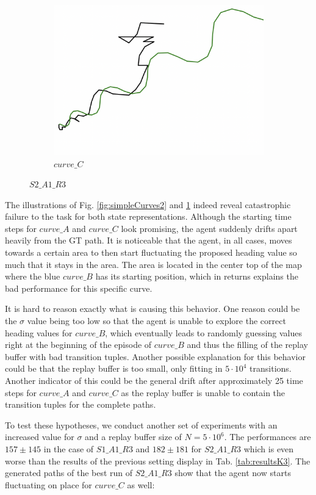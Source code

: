 \begin{figure}[H]
\begin{subfigure}[b]{0.31\textwidth}
         \includegraphics[width=\textwidth]{images/ddpg_results/simple_envs_S1_S2/S2_A1_R3_K3_curve_C.png}
         \caption{$curve\_C$}
     \end{subfigure}
        \caption{$S2\_A1\_R3$}
        \label{fig:simpleCurves3}
\end{figure}

The illustrations of Fig. \ref{fig:simpleCurves2} and \ref{fig:simpleCurves3} indeed reveal catastrophic failure to the task for both state representations. Although the starting time steps for $curve\_A$ and $curve\_C$ look promising, the agent suddenly drifts apart heavily from the GT path. It is noticeable that the agent, in all cases, moves towards a certain area to then start fluctuating the proposed heading value so much that it stays in the area. The area is located in the center top of the map where the blue $curve\_B$ has its starting position, which in returns explains the bad performance for this specific curve. 
\par
It is hard to reason exactly what is causing this behavior. One reason could be the $\sigma$ value being too low so that the agent is unable to explore the correct heading values for $curve\_B$, which eventually leads to randomly guessing values right at the beginning of the episode of $curve\_B$ and thus the filling of the replay buffer with bad transition tuples. Another possible explanation for this behavior could be that the replay buffer is too small, only fitting in $5\cdot 10^4$ transitions. Another indicator of this could be the general drift after approximately 25 time steps for $curve\_A$ and $curve\_C$ as the replay buffer is unable to contain the transition tuples for the complete paths.
\par
To test these hypotheses, we conduct another set of experiments with an increased value for $\sigma$ and a replay buffer size of $N=5\cdot 10^6$. The performances are $157 \pm 145$ in the case of $S1\_A1\_R3$ and $182 \pm 181$ for $S2\_A1\_R3$ which is even worse than the results of the previous setting display in Tab. \ref{tab:resultsK3}. The generated paths of the best run of $S2\_A1\_R3$ show that the agent now starts fluctuating on place for $curve\_C$ as well:

